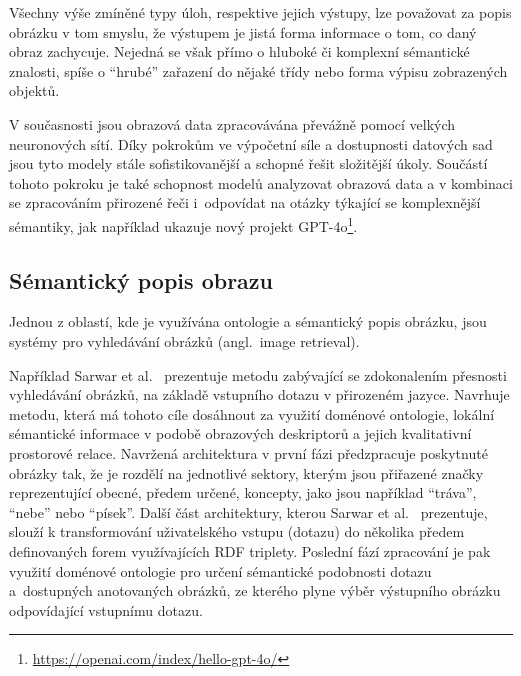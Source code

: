 Všechny výše zmíněné typy úloh, respektive jejich výstupy, lze považovat za popis obrázku v tom smyslu,
že výstupem je jistá forma informace o tom, co daný obraz zachycuje.
Nejedná se však přímo o hluboké či komplexní sémantické znalosti, spíše o \enquote{hrubé} zařazení do nějaké třídy nebo forma výpisu zobrazených objektů.

V současnosti jsou obrazová data zpracovávána převážně pomocí velkých neuronových sítí.
Díky pokrokům ve výpočetní síle a dostupnosti datových sad jsou tyto modely stále sofistikovanější a schopné řešit složitější úkoly.
Součástí tohoto pokroku je také schopnost modelů analyzovat obrazová data a v kombinaci se zpracováním přirozené řeči i~odpovídat na otázky týkající se komplexnější sémantiky,
jak například ukazuje nový projekt GPT-4o\footnote{\href{https://openai.com/index/hello-gpt-4o/}{https://openai.com/index/hello-gpt-4o/}}.

\newpage
\subsection{Sémantický popis obrazu}
Jednou z oblastí, kde je využívána ontologie a sémantický popis obrázku, jsou systémy pro vyhledávání obrázků (angl.~image retrieval).

Například Sarwar et al.~\cite{SARWAR2013285} prezentuje metodu zabývající se zdokonalením přesnosti vyhledávání obrázků,
na základě vstupního dotazu v přirozeném jazyce.
Navrhuje metodu, která má tohoto cíle dosáhnout za využití doménové ontologie, lokální sémantické informace v podobě
obrazových deskriptorů a jejich kvalitativní prostorové relace.
Navržená architektura v první fázi předzpracuje poskytnuté obrázky tak, že je rozdělí na jednotlivé sektory, kterým jsou
přiřazené značky reprezentující obecné, předem určené, koncepty, jako jsou například \enquote{tráva}, \enquote{nebe} nebo \enquote{písek}.
Další část architektury, kterou Sarwar et al.~\cite{SARWAR2013285} prezentuje, slouží k transformování uživatelského vstupu (dotazu)
do několika předem definovaných forem využívajících RDF triplety.
Poslední fází zpracování je pak využití doménové ontologie pro určení sémantické podobnosti dotazu a~dostupných anotovaných obrázků,
ze kterého plyne výběr výstupního obrázku odpovídající vstupnímu dotazu.

